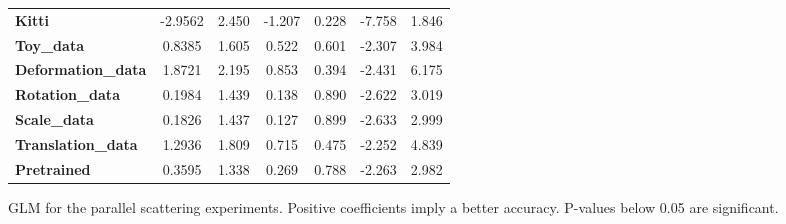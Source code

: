 \begin{figure}[!htb]
\begin{center}
\begin{tabular}{lcccccc}
			\textbf{Kitti}             &      -2.9562  &        2.450     &    -1.207  &         0.228        &       -7.758    &        1.846     \\
			\textbf{Toy\_data}         &       0.8385  &        1.605     &     0.522  &         0.601        &       -2.307    &        3.984     \\
			\textbf{Deformation\_data} &       1.8721  &        2.195     &     0.853  &         0.394        &       -2.431    &        6.175     \\
			\textbf{Rotation\_data}    &       0.1984  &        1.439     &     0.138  &         0.890        &       -2.622    &        3.019     \\
			\textbf{Scale\_data}       &       0.1826  &        1.437     &     0.127  &         0.899        &       -2.633    &        2.999     \\
			\textbf{Translation\_data} &       1.2936  &        1.809     &     0.715  &         0.475        &       -2.252    &        4.839     \\
			\textbf{Pretrained}        &       0.3595  &        1.338     &     0.269  &         0.788        &       -2.263    &        2.982     \\
			\bottomrule
		\end{tabular}
	\end{center}
\caption{GLM for the parallel scattering experiments. Positive coefficients imply a better accuracy. P-values below 0.05 are significant.}
\label{fig:GLM_parallel_scattering}
\end{figure}

